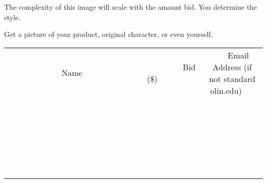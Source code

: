 \documentclass[11pt]{article}
\begin{document}
The complexity of this image will scale with the amount bid.
You determine the style.

Get a picture of your product, original character, or even yourself. \\
					[6ex]
					\begin{tabular}{c c c}
						~~~~~~~~~~~~~Name~~~~~~~~~~~~~ & ~~~~~~~~~Bid (\$)~~~~~~~~~ & ~~~Email Address (if not standard olin.edu)~~~ \\
				
 & & \\
\hline
 & & \\
\hline
 & & \\
\hline
 & & \\
\hline
 & & \\
\hline
 & & \\
\hline
 & & \\
\hline
 & & \\
\hline
 & & \\
\hline
 & & \\
\hline
 & & \\
\hline
 & & \\
\hline
 & & \\
\hline
 & & \\
\hline
 & & \\
\hline
 & & \\
\hline
 & & \\
\hline
 & & \\
\hline
 & & \\
\hline
 & & \\
\hline
 & & \\
\hline
 & & \\
\hline
 & & \\
\hline
 & & \\
\hline
 & & \\
\hline
 & & \\
\hline
					\end{tabular}
					\clearpage
				
\end{document}
